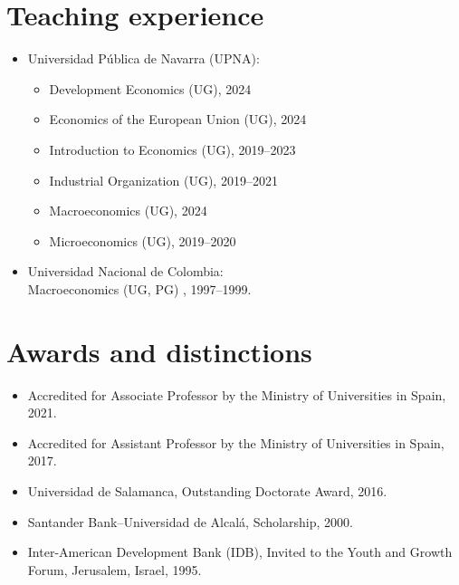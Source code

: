 \documentclass[11pt]{article}\usepackage[]{graphicx}\usepackage[usenames,dvipsnames]{xcolor}
\begin{document}
\section{Teaching experience} 
\begin{itemize}
  \item Universidad Pública de Navarra (UPNA):
  \begin{itemize}
    \item Development Economics (UG), 2024
    \item Economics of the European Union (UG), 2024
    \item Introduction to Economics (UG), 2019--2023
    \item Industrial Organization (UG), 2019--2021
    \item Macroeconomics (UG), 2024
    \item Microeconomics (UG), 2019--2020
  \end{itemize}
  \item Universidad Nacional de Colombia:\\
  Macroeconomics (UG, PG) , 1997--1999.
\end{itemize}

\section{Awards and distinctions} 
\begin{itemize}
  \item Accredited for Associate Professor by the Ministry of Universities in Spain, 2021.
  \item Accredited for Assistant Professor by the Ministry of Universities in Spain, 2017.
  \item Universidad de Salamanca, Outstanding Doctorate Award, 2016.
  \item Santander Bank--Universidad de Alcalá, Scholarship, 2000.
  \item Inter-American Development Bank (IDB), Invited to the Youth and Growth Forum, Jerusalem, Israel, 1995.
\end{itemize}
\end{document}
